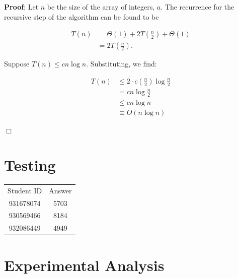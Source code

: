 \documentclass[a4paper,10pt]{article}
\begin{document}
		{\bf Proof}: Let $n$ be the size of the array of integers, $a$. The recurrence for the recursive step of the algorithm can be found to be

		\begin{align*}
		T(n) &= \Theta(1) + 2T\left(\frac{n}{2}\right) + \Theta(1) \\
			&= 2T\left(\frac{n}{2}\right).
		\end{align*}

		Suppose $T(n) \leq cn \log n$. Substituting, we find:

		\begin{align*}
		T(n) &\leq 2 \cdot c\left(\frac{n}{2}\right) \log \frac{n}{2} \\
			&= cn \log \frac{n}{2} \\
			&\leq cn \log n \\
			&\equiv O(n \log n)
		\end{align*}

		\begin{center}
		$\Box$
		\end{center}


	\section{Testing}

		\begin{tabular}{ | c | c | }
		\hline
		Student ID & Answer\\
		931678074 & 5703 \\
		930569466 & 8184 \\
		932086449 & 4949 \\
		\hline
		\end{tabular}

	\newpage
	\section{Experimental Analysis}
\end{document}
